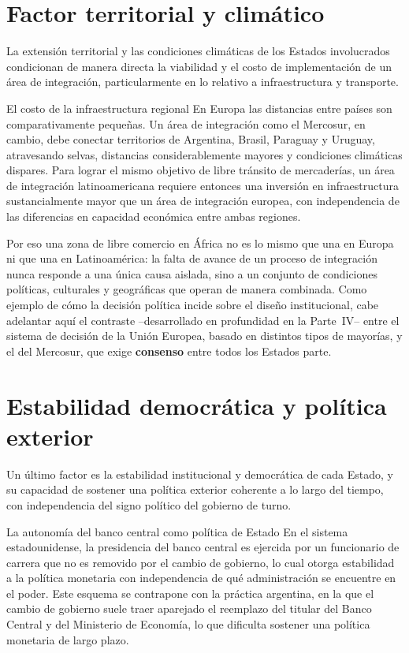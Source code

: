 \documentclass[12pt,oneside]{book}
\begin{document}
\section{Factor territorial y climático}

La extensión territorial y las condiciones climáticas de los Estados involucrados condicionan de manera directa la viabilidad y el costo de implementación de un área de integración, particularmente en lo relativo a infraestructura y transporte.

\begin{ejemplo}{El costo de la infraestructura regional}
En Europa las distancias entre países son comparativamente pequeñas. Un área de integración como el Mercosur, en cambio, debe conectar territorios de Argentina, Brasil, Paraguay y Uruguay, atravesando selvas, distancias considerablemente mayores y condiciones climáticas dispares. Para lograr el mismo objetivo de libre tránsito de mercaderías, un área de integración latinoamericana requiere entonces una inversión en infraestructura sustancialmente mayor que un área de integración europea, con independencia de las diferencias en capacidad económica entre ambas regiones.
\end{ejemplo}

Por eso una zona de libre comercio en África no es lo mismo que una en Europa ni que una en Latinoamérica: la falta de avance de un proceso de integración nunca responde a una única causa aislada, sino a un conjunto de condiciones políticas, culturales y geográficas que operan de manera combinada. Como ejemplo de cómo la decisión política incide sobre el diseño institucional, cabe adelantar aquí el contraste --desarrollado en profundidad en la Parte~IV-- entre el sistema de decisión de la Unión Europea, basado en distintos tipos de mayorías, y el del Mercosur, que exige \textbf{consenso} entre todos los Estados parte.

\section{Estabilidad democrática y política exterior}

Un último factor es la estabilidad institucional y democrática de cada Estado, y su capacidad de sostener una política exterior coherente a lo largo del tiempo, con independencia del signo político del gobierno de turno.

\begin{ejemplo}{La autonomía del banco central como política de Estado}
En el sistema estadounidense, la presidencia del banco central es ejercida por un funcionario de carrera que no es removido por el cambio de gobierno, lo cual otorga estabilidad a la política monetaria con independencia de qué administración se encuentre en el poder. Este esquema se contrapone con la práctica argentina, en la que el cambio de gobierno suele traer aparejado el reemplazo del titular del Banco Central y del Ministerio de Economía, lo que dificulta sostener una política monetaria de largo plazo.
\end{ejemplo}
\end{document}
